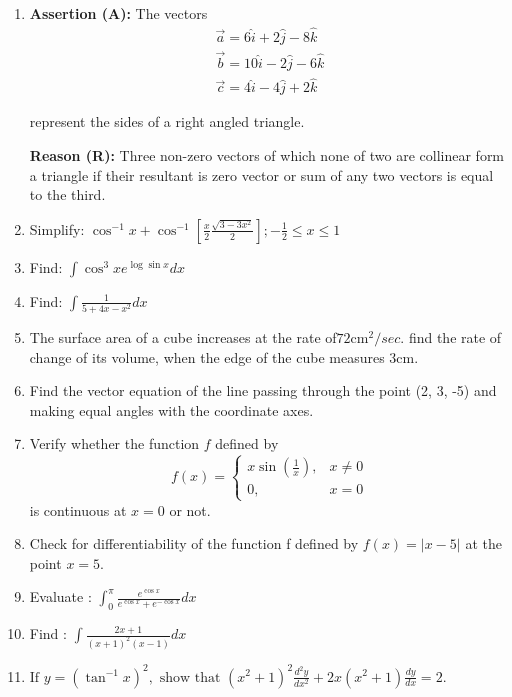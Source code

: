\documentclass{article}
\providecommand{\brak}[1]{\ensuremath{\left(#1\right)}}
\providecommand{\sbrak}[1]{\ensuremath{{}\left[#1\right]}}
\begin{document}
\begin{enumerate}

\item \textbf{Assertion (A): } The vectors
	\begin{align*}
 \vec{a} = 6\hat{i}+2\hat{j}-8\hat{k}\\
 \vec{b} = 10\hat{i}-2\hat{j}-6\hat{k}\\
 \vec{c} = 4\hat{i}-4\hat{j}+2\hat{k}
	\end{align*}
 \centerline{represent the sides of a right angled triangle.}

 \textbf{Reason (R): } Three non-zero vectors of which none of two are collinear form a triangle if their resultant is zero vector or sum of any two vectors is equal to the third.

\item Simplify: $\cos^{-1}x + \cos^{-1}\sbrak{\frac{x}{2}{\frac{\sqrt{3-3x^2}}{2}}};-\frac{1}{2} \leq x \leq 1$

\item Find: $\int \cos^3{x} e^{\log{\sin{x}}} dx $

\item Find: $\int \frac{1}{5+4x-x^2}dx$

\item The surface area of a cube increases at the rate of$72\mathrm{cm}^2/sec.$ find the rate of change of its volume, when the edge of the cube measures $3\mathrm{cm}.$

\item Find the vector equation of the line passing through the point (2, 3, -5) and making equal angles with the coordinate axes.

\item Verify whether the function $f$ defined by
	$$f\brak{x}= \begin{cases}
 x\sin\left(\frac{1}{x}\right), & x \neq 0 \\
 0, & x=0
 \end{cases}$$
 is continuous at $x=0$ or not.

\item Check for differentiability of the function f defined by $f(x) =|x-5|$ at the point $x=5$.

\item Evaluate : $\int_{0}^{\pi} \frac{e^{\cos{x}}}{e^{\cos{x}} + e^{-\cos{x}}} dx$
\\
\item Find : $\int \frac{2x+1}{(x+1)^2( x-1)} dx$

\item $\text{If } y = (\tan^{-1}x)^2, \text{ show that } (x^2+1)^2 \frac{d^2y}{dx^2} + 2x(x^2+1) \frac{dy}{dx} = 2.$


\end{enumerate}
\end{document}
